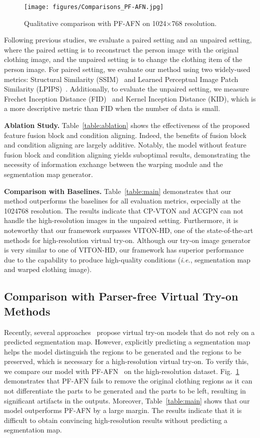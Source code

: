 \begin{figure}[b!]
    \texttt{[image: figures/Comparisons\_PF-AFN.jpg]}
    \caption{Qualitative comparison with PF-AFN on 1024×768 resolution.}
    \label{fig:PF}
\end{figure}
Following previous studies, we evaluate a paired setting and an unpaired setting, where the paired setting is to reconstruct the person image with the original clothing image, and the unpaired setting is to change the clothing item of the person image.
For paired setting, we evaluate our method using two widely-used metrics: Structural Similarity (SSIM)~\cite{wang2004image} and Learned Perceptual Image Patch Similarity (LPIPS)~\cite{zhang2018unreasonable}.
Additionally, to evaluate the unpaired setting, we measure Frechet Inception Distance (FID)~\cite{heusel2017gans} and Kernel Inception Distance (KID), which is a more descriptive metric than FID when the number of data is small.

\noindent \textbf{Ablation Study.}
Table~\ref{table:ablation} shows the effectiveness of the proposed feature fusion block and condition aligning.
Indeed, the benefits of fusion block and condition aligning are largely additive.
Notably, the model without feature fusion block and condition aligning yields suboptimal results, demonstrating the necessity of information exchange between the warping module and the segmentation map generator.

\noindent \textbf{Comparison with Baselines.} Table~\ref{table:main} demonstrates that our method outperforms the baselines for all evaluation metrics, especially at the 1024768 resolution.
The results indicate that CP-VTON and ACGPN can not handle the high-resolution images in the unpaired setting.
Furthermore, it is noteworthy that our framework surpasses VITON-HD, one of the state-of-the-art methods for high-resolution virtual try-on.
Although our try-on image generator is very similar to one of VITON-HD, our framework has superior performance due to the capability to produce high-quality conditions (\textit{i.e.}, segmentation map and warped clothing image).

\subsection{Comparison with Parser-free Virtual Try-on Methods}
Recently, several approaches~\cite{issenhuth2020not,ge2021parser} propose virtual try-on models that do not rely on a predicted segmentation map.
However, explicitly predicting a segmentation map helps the model distinguish the regions to be generated and the regions to be preserved, which is necessary for a high-resolution virtual try-on.
To verify this, we compare our model with PF-AFN~\cite{ge2021parser} on the high-resolution dataset.
Fig.~\ref{fig:PF} demonstrates that PF-AFN fails to remove the original clothing regions as it can not differentiate the parts to be generated and the parts to be left, resulting in significant artifacts in the outputs.
Moreover, Table~\ref{table:main} shows that our model outperforms PF-AFN by a large margin.
The results indicate that it is difficult to obtain convincing high-resolution results without predicting a segmentation map.

